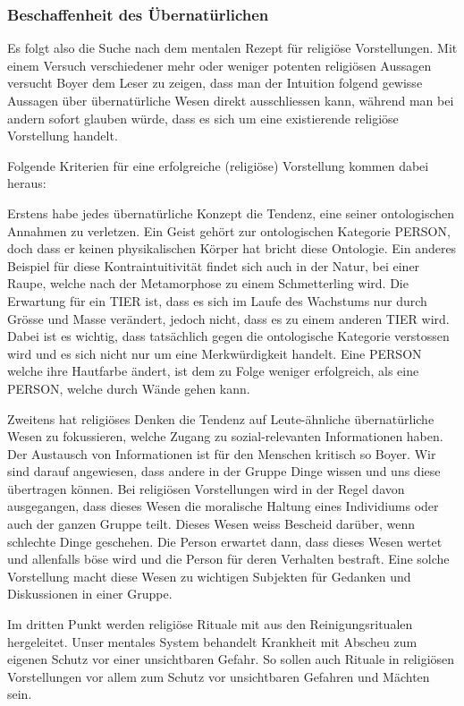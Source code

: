 \subsubsection*{Beschaffenheit des Übernatürlichen}
Es folgt also die Suche nach dem mentalen Rezept für religiöse Vorstellungen. Mit einem Versuch verschiedener mehr oder weniger potenten religiösen Aussagen versucht Boyer dem Leser zu zeigen, dass man der Intuition folgend gewisse Aussagen über übernatürliche Wesen direkt ausschliessen kann, während man bei andern sofort glauben würde, dass es sich um eine existierende religiöse  Vorstellung handelt. 

Folgende Kriterien für eine erfolgreiche (religiöse) Vorstellung kommen dabei heraus:

Erstens habe jedes übernatürliche Konzept die Tendenz, eine seiner ontologischen Annahmen zu verletzen. Ein Geist gehört zur ontologischen Kategorie PERSON, doch dass er keinen physikalischen Körper hat bricht diese Ontologie. Ein anderes Beispiel für diese Kontraintuitivität findet sich auch in der Natur, bei einer Raupe, welche nach der Metamorphose zu einem Schmetterling wird. Die Erwartung für ein TIER ist, dass es sich im Laufe des Wachstums nur durch Grösse und Masse verändert, jedoch nicht, dass es zu einem anderen TIER wird. Dabei ist es wichtig, dass tatsächlich gegen die ontologische Kategorie verstossen wird und es sich nicht nur um eine Merkwürdigkeit handelt. Eine PERSON welche ihre Hautfarbe ändert, ist dem zu Folge weniger erfolgreich, als eine PERSON, welche durch Wände gehen kann. 

Zweitens hat religiöses Denken die Tendenz auf Leute-ähnliche übernatürliche Wesen zu fokussieren, welche Zugang zu sozial-relevanten Informationen haben. Der Austausch von Informationen ist für den Menschen kritisch so Boyer. Wir sind darauf angewiesen, dass andere in der Gruppe Dinge wissen und uns diese übertragen können. Bei religiösen Vorstellungen wird in der Regel davon ausgegangen, dass dieses Wesen die moralische Haltung eines Individiums oder auch der ganzen Gruppe teilt. Dieses Wesen weiss Bescheid darüber, wenn schlechte Dinge geschehen. Die Person erwartet dann, dass dieses Wesen wertet und allenfalls böse wird und die Person für deren Verhalten bestraft. Eine solche Vorstellung macht diese Wesen zu wichtigen Subjekten für Gedanken und Diskussionen in einer Gruppe.

Im dritten Punkt werden religiöse Rituale mit aus den Reinigungsritualen hergeleitet. Unser mentales System behandelt Krankheit mit Abscheu zum eigenen Schutz vor einer unsichtbaren Gefahr. So sollen auch Rituale in religiösen Vorstellungen vor allem zum Schutz vor unsichtbaren Gefahren und Mächten sein.

